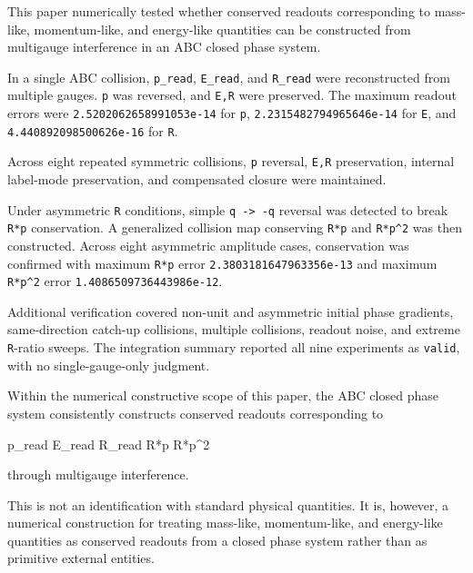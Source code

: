 \documentclass[
  a4paper,
]{article}
\newenvironment{Shaded}{}{}
\newcommand{\NormalTok}[1]{#1}
\begin{document}
This paper numerically tested whether conserved readouts corresponding
to mass-like, momentum-like, and energy-like quantities can be
constructed from multigauge interference in an ABC closed phase system.

In a single ABC collision, \texttt{p\_read}, \texttt{E\_read}, and
\texttt{R\_read} were reconstructed from multiple gauges. \texttt{p} was
reversed, and \texttt{E,R} were preserved. The maximum readout errors
were \texttt{2.5202062658991053e-14} for \texttt{p},
\texttt{2.2315482794965646e-14} for \texttt{E}, and
\texttt{4.440892098500626e-16} for \texttt{R}.

Across eight repeated symmetric collisions, \texttt{p} reversal,
\texttt{E,R} preservation, internal label-mode preservation, and
compensated closure were maintained.

Under asymmetric \texttt{R} conditions, simple
\texttt{q\ -\textgreater{}\ -q} reversal was detected to break
\texttt{R*p} conservation. A generalized collision map conserving
\texttt{R*p} and \texttt{R*p\^{}2} was then constructed. Across eight
asymmetric amplitude cases, conservation was confirmed with maximum
\texttt{R*p} error \texttt{2.3803181647963356e-13} and maximum
\texttt{R*p\^{}2} error \texttt{1.4086509736443986e-12}.

Additional verification covered non-unit and asymmetric initial phase
gradients, same-direction catch-up collisions, multiple collisions,
readout noise, and extreme \texttt{R}-ratio sweeps. The integration
summary reported all nine experiments as \texttt{valid}, with no
single-gauge-only judgment.

Within the numerical constructive scope of this paper, the ABC closed
phase system consistently constructs conserved readouts corresponding to

\begin{Shaded}
\begin{Highlighting}[]
\NormalTok{p\_read}
\NormalTok{E\_read}
\NormalTok{R\_read}
\NormalTok{R*p}
\NormalTok{R*p\^{}2}
\end{Highlighting}
\end{Shaded}

through multigauge interference.

This is not an identification with standard physical quantities. It is,
however, a numerical construction for treating mass-like, momentum-like,
and energy-like quantities as conserved readouts from a closed phase
system rather than as primitive external entities.
\end{document}
